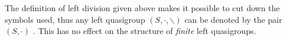     



\noindent The definition of left division given above makes it possible to cut down the symbols used, thus any left quasigroup $(S, \cdot, \backslash)$ can be denoted by the pair $(S, \cdot)$ \cite{bonatto2021malcev, bonatto2022medial}. \newline This has no effect on the structure of \emph{finite} left quasigroups. \newline

